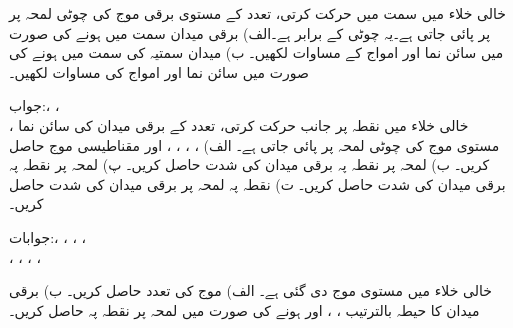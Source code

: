 \newpage
{}

خالی خلاء میں  سمت میں حرکت کرتی،  تعدد  کے مستوی برقی موج  کی  چوٹی لمحہ  پر   پر پائی جاتی ہے۔یہ چوٹی  کے برابر ہے۔الف) برقی میدان  سمت میں ہونے کی صورت میں سائن نما   اور  امواج کے مساوات لکھیں۔ ب) میدان سمتیہ  کی سمت میں ہونے کی صورت
 میں سائن نما   اور   امواج کی مساوات لکھیں۔

جواب:، ،\\ ،  
خالی خلاء میں  نقطہ  پر  جانب حرکت کرتی،  تعدد کے برقی میدان کی سائن نما مستوی موج کی چوٹی لمحہ  پر  پائی جاتی ہے۔ الف) ، ، ، ،  اور مقناطیسی موج  حاصل کریں۔  ب) لمحہ  پر نقطہ  پہ برقی میدان کی شدت  حاصل کریں۔ پ) لمحہ  پر نقطہ  پہ برقی میدان کی شدت  حاصل کریں۔ ت) نقطہ  پہ لمحہ  پر برقی میدان کی شدت حاصل کریں۔ 

جوابات:، ، ، ، \\
،  ، ، ، 

خالی خلاء میں مستوی موج  دی گئی ہے۔ الف) موج کی تعدد  حاصل کریں۔ ب) برقی میدان کا حیطہ بالترتیب ، ،  اور  ہونے کی صورت میں لمحہ  پر نقطہ  پہ  حاصل کریں۔


